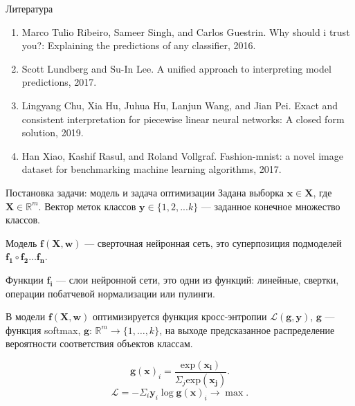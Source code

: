 \documentclass{beamer}
\begin{document}
\begin{frame}{Литература}
\begin{enumerate}
	\item Marco Tulio Ribeiro, Sameer Singh, and Carlos Guestrin. Why should i trust you?: Explaining the
predictions of any classifier, 2016.
	\item Scott Lundberg and Su-In Lee. A unified approach to interpreting model predictions, 2017.
	\item Lingyang Chu, Xia Hu, Juhua Hu, Lanjun Wang, and Jian Pei. Exact and consistent interpretation for
piecewise linear neural networks: A closed form solution, 2019.
	\item Han Xiao, Kashif Rasul, and Roland Vollgraf. Fashion-mnist: a novel image dataset for benchmarking
machine learning algorithms, 2017.
\end{enumerate}
\end{frame}
\begin{frame}{Постановка задачи: модель и задача оптимизации}
Задана выборка $\mathbf{x} \in \mathbf{X}$, где $\mathbf{X} \in \mathbb{R}^m$. Вектор меток классов $\mathbf{y} \in \{1, 2, ... k\}$ --- заданное конечное множество классов.

Модель $\mathbf{f}(\mathbf{X}, \mathbf{w})$ --- сверточная нейронная сеть, это суперпозиция подмоделей $\mathbf{f_1} \circ \mathbf{f_2} \dots \mathbf{f_n}$.

Функции $\mathbf{f_i}$ --- слои нейронной сети, это одни из функций: линейные, свертки, операции побатчевой нормализации или пулинги.

В модели $\mathbf{f}(\mathbf{X}, \mathbf{w})$ оптимизируется функция кросс-энтропии $\mathcal{L}(\mathbf{g}, \mathbf{y})$, $\mathbf{g}$ --- функция softmax, $\mathbf{g}$: $\mathbb{R}^m \to \{1,\dots,k\}$, на выходе предсказанное распределение вероятности соответствия объектов классам.

$$\mathbf{g}(\mathbf{x})_i = \frac{\text{exp}(\mathbf{x_i})}{\Sigma_j \text{exp}(\mathbf{x_j})}.$$
$$\mathcal{L} = -\Sigma_i \mathbf{y}_i \log \mathbf{g}(\mathbf{x})_i \to \max.$$

\end{frame}
\end{document}
